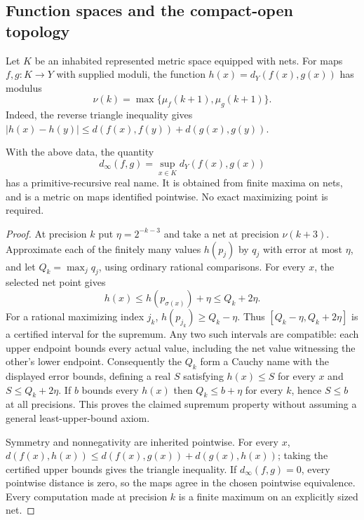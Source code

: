 \subsection{Function spaces and the compact-open topology}

Let $K$ be an inhabited represented metric space equipped with nets.
For maps $f,g:K\to Y$ with supplied moduli, the function
$h(x)=d_Y(f(x),g(x))$ has modulus
\begin{equation}\label{eq:distance-function-modulus}
 \nu(k)=\max\{\mu_f(k+1),\mu_g(k+1)\}.
\end{equation}
Indeed, the reverse triangle inequality gives
$|h(x)-h(y)|\leq d(f(x),f(y))+d(g(x),g(y))$.

\begin{theorem}
\label{thm:computable-uniform-metric}
With the above data, the quantity
\[
 d_\infty(f,g)=\sup_{x\in K}d_Y(f(x),g(x))
\]
has a primitive-recursive real name.  It is obtained from finite maxima
on nets, and is a metric on maps identified pointwise.  No exact
maximizing point is required.
\end{theorem}
\begin{proof}
At precision $k$ put $\eta=2^{-k-3}$ and take a net at
precision $\nu(k+3)$.  Approximate each of the finitely many values
$h(p_j)$ by $q_j$ with error at most $\eta$, and let $Q_k=\max_jq_j$,
using ordinary rational comparisons.  For every $x$, the selected net
point gives
\[
 h(x)\leq h(p_{\sigma(x)})+\eta\leq Q_k+2\eta.
\]
For a rational maximizing index $j_k$,
$h(p_{j_k})\geq Q_k-\eta$.  Thus $[Q_k-\eta,Q_k+2\eta]$ is a
certified interval for the supremum.  Any two such intervals are
compatible: each upper endpoint bounds every actual value, including the
net value witnessing the other's lower endpoint.  Consequently the
$Q_k$ form a Cauchy name with the displayed error bounds, defining a real
$S$ satisfying $h(x)\leq S$ for every $x$ and
$S\leq Q_k+2\eta$.  If $b$ bounds every $h(x)$ then
$Q_k\leq b+\eta$ for every $k$, hence $S\leq b$ at all precisions.
This proves the claimed supremum property without assuming a general
least-upper-bound axiom.

Symmetry and nonnegativity are inherited pointwise.  For every $x$,
$d(f(x),h(x))\leq d(f(x),g(x))+d(g(x),h(x))$; taking the certified
upper bounds gives the triangle inequality.  If $d_\infty(f,g)=0$,
every pointwise distance is zero, so the maps agree in the chosen
pointwise equivalence.  Every computation made at precision $k$ is a
finite maximum on an explicitly sized net.
\end{proof}

